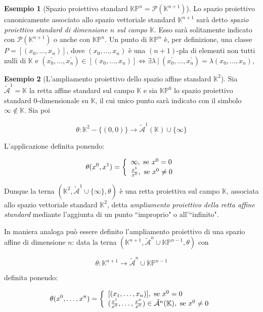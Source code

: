 \documentclass{book}
\theoremstyle{definition}
\newtheorem{esempio}{Esempio}
\newcommand{\CMP}{\mathbb{K}}
\newcommand{\Spr}{\mathscr{P}}
\begin{document}
\begin{esempio}[Spazio proiettivo standard $\mathbb{KP}^n = \mathscr{P}(\mathbb{K}^{n+1})$]
    Lo spazio proiettivo canonicamente associato allo spazio vettoriale standard $\CMP^{n+1}$ sarà detto \emph{spazio proiettivo standard di dimensione $n$ sul campo $\CMP$}.
    Esso sarà solitamente indicato con $\Spr(\CMP^{n+1})$ o anche con $\mathbb{KP}^n$.
    Un punto di $\mathbb{KP}^n$ è, per definizione, una classe $P=[(x_0, \dots, x_n)]$, dove $(x_0, \dots, x_n)$ è una $(n+1)$-pla di elementi non tutti nulli di $\CMP$ e 
    $(x_0^\prime, \dots, x_n^\prime) \in [(x_0, \dots, x_n)] \iff \exists \lambda \ | \ (x_0^\prime, \dots, x_n^\prime) = \lambda (x_0, \dots, x_n)$,
\end{esempio}

\begin{esempio}[L'ampliamento proiettivo dello spazio affine standard $\mathbb{K}^2$]
Sia $\tilde{\mathcal{A}}^1 = \CMP$ la retta affine standard sul campo $\CMP$ e sia $\CMP\mathbb{P}^0$ lo spazio proiettivo standard
0-dimensionale su $\CMP$, il cui unico punto sarà indicato con il simbolo $\infty \notin \CMP$. Sia poi

\[
    \theta : \CMP^2 - \{(0, 0)\} \rightarrow \tilde{\mathcal{A}}^1(\CMP) \cup \{\infty\}
\]

L'applicazione definita ponendo:

\[
    \theta(x^0, x^1) = \left\{ 
        \begin{array}{ll}
            \infty, \ \textnormal{se} \ x^0 = 0 \\
            \frac{x^1}{x^0}, \ \textnormal{se} \ x^0 \neq 0 \\
        \end{array}
    \right.
\]

Dunque la terna $(\CMP^2, \tilde{\mathcal{A}}^1 \cup \{\infty\}, \theta)$ è una retta proiettiva sul campo $\CMP$, associata allo spazio vettoriale standard $\CMP^2$,
detta \emph{ampliamento proiettivo della retta affine standard} mediante l'aggiunta di un punto ``improprio" o all'``infinito".

In maniera analoga può essere definito l'ampliamento proiettivo di una spazio affine di dimensione $n$:
data la terna $(\CMP^{n+1}, \tilde{\mathcal{A}}^n \cup \mathbb{KP}^{n-1}, \theta)$ con

\[
    \theta : \CMP^{n+1} \rightarrow \tilde{\mathcal{A}}^n \cup \mathbb{KP}^{n-1}
\]

definita ponendo:

\[
    \theta(x^0, \dots, x^{n}) = \left\{ 
        \begin{array}{ll}
            [(x_1, \dots, x_n)], \ \textnormal{se} \ x^0 = 0 \\
            (\frac{x^1}{x^0}, \dots, \frac{x^n}{x^0}) \in \tilde{\mathcal{A}}^n(\CMP), \ \textnormal{se} \ x^0 \neq 0 \\
        \end{array}
    \right.
\]


\end{esempio}
\end{document}
